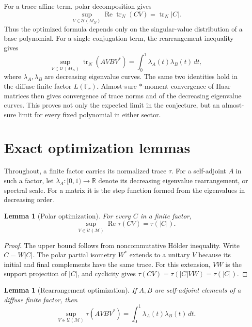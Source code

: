\documentclass[11pt]{article}
\newtheorem{lemma}[theorem]{Lemma}
\theoremstyle{remark}
\newcommand{\trN}{\operatorname{tr}_N}
\newcommand{\U}{\mathcal U}
\newcommand{\M}{\mathcal M}
\begin{document}
For a trace-affine term, polar decomposition gives
\[
             \sup_{V\in\U(M_N)}\operatorname{Re}\trN(CV)=\trN|C|.
\]
Thus the optimized formula depends only on the singular-value distribution
of a base polynomial.  For a single conjugation term, the rearrangement
inequality gives
\[
 \sup_{V\in\U(M_N)}\trN(AVBV^*)
 =\int_0^1\lambda_A(t)\lambda_B(t)\,dt,
\]
where $\lambda_A,\lambda_B$ are decreasing eigenvalue curves.  The same two
identities hold in the diffuse finite factor $L(\mathbb F_r)$.  Almost-sure
$*$-moment convergence of Haar matrices then gives convergence of trace
norms and of the decreasing eigenvalue curves.  This proves not only the
expected limit in the conjecture, but an almost-sure limit for every fixed
polynomial in either sector.

\section{Exact optimization lemmas}

Throughout, a finite factor carries its normalized trace $\tau$.  For a
self-adjoint $A$ in such a factor, let $\lambda_A:[0,1)\to\mathbb R$ denote
its decreasing eigenvalue rearrangement, or spectral scale.  For a matrix it
is the step function formed from the eigenvalues in decreasing order.

\begin{lemma}[Polar optimization]\label{lem:polar}
For every $C$ in a finite factor,
\begin{equation}\label{eq:polar}
                 \sup_{V\in\U(\M)}\operatorname{Re}\tau(CV)=\tau(|C|).
\end{equation}
\end{lemma}

\begin{proof}
The upper bound follows from noncommutative H\"older inequality.  Write
$C=W|C|$.  The polar partial isometry $W^*$ extends to a unitary $V$ because
its initial and final complements have the same trace.  For this extension,
$VW$ is the support projection of $|C|$, and cyclicity gives
$\tau(CV)=\tau(|C|VW)=\tau(|C|)$.
\end{proof}

\begin{lemma}[Rearrangement optimization]\label{lem:rearrangement}
If $A,B$ are self-adjoint elements of a diffuse finite factor, then
\begin{equation}\label{eq:rearrangement}
 \sup_{V\in\U(\M)}\tau(AVBV^*)
 =\int_0^1\lambda_A(t)\lambda_B(t)\,dt.
\end{equation}
\end{lemma}
\end{document}
